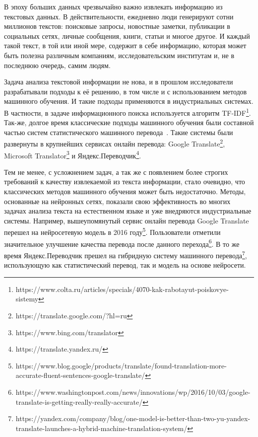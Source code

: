 \par В эпоху больших данных чрезвычайно важно извлекать информацию из текстовых данных. В действительности, ежедневно люди генерируют сотни миллионов текстов: поисковые запросы, новостные заметки, публикации в социальных сетях, личные сообщения, книги, статьи и многое другое. И каждый такой текст, в той или иной мере, содержит в себе информацию, которая может быть полезна различным компаниям, исследовательским институтам и, не в последнюю очередь, самим людям.
\par Задача анализа текстовой информации не нова, и в прошлом исследователи разрабатывали подходы к её решению, в том числе и с использованием методов машинного обучения. И такие подходы применяются в индустриальных системах. В частности, в задаче информационного поиска используется алгоритм TF-IDF\footnote{https://www.colta.ru/articles/specials/4070-kak-rabotayut-poiskovye-sistemy}. Так-же, долгое время классические подходы машинного обучения были составной частью систем статистического машинного перевода~\cite{statmt-book}. Такие системы были развернуты в крупнейших сервисах онлайн перевода: Google Translate\footnote{https://translate.google.com/?hl=ru}, Microsoft Translator\footnote{https://www.bing.com/translator} и Яндекс.Переводчик\footnote{https://translate.yandex.ru/}.

\par Тем не менее, с усложнением задач, а так же с появлением более строгих требований к качеству извлекаемой из текста информации, стало очевидно, что классических методов машинного обучения может быть недостаточно. Методы, основанные на нейронных сетях, показали свою эффективность во многих задачах анализа текста на естественном языке и уже внедряются индустриальные системы. Например, вышеупомянутый сервис онлайн перевода Google Translate перешел на нейросетевую модель в 2016 году\footnote{https://www.blog.google/products/translate/found-translation-more-accurate-fluent-sentences-google-translate/}. Пользователи отметили значительное улучшение качества перевода после данного перехода\footnote{https://www.washingtonpost.com/news/innovations/wp/2016/10/03/google-translate-is-getting-really-really-accurate/}. В то же время Яндекс.Переводчик прешел на гибридную систему машинного перевода\footnote{https://yandex.com/company/blog/one-model-is-better-than-two-yu-yandex-translate-launches-a-hybrid-machine-translation-system/}, использующую как статистический перевод, так и модель на основе нейросети.

